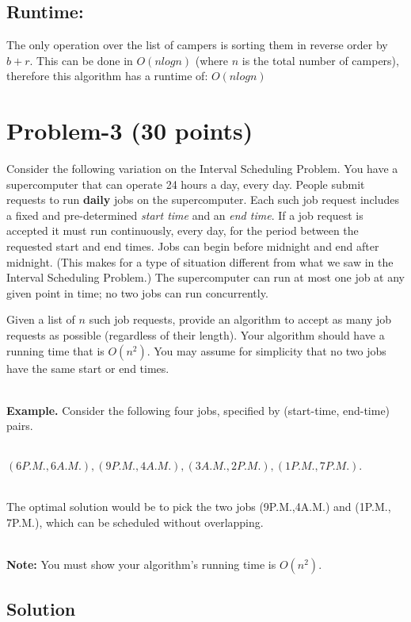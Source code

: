 \documentclass[11pt]{article}
\begin{document}
\subsection*{Runtime:}
The only operation over the list of campers is sorting them in reverse order by $b+r$. This can be done in $O(nlogn)$ (where $n$ is the total number of campers), therefore this algorithm has a runtime of: $O(nlogn)$

\newpage
\section*{Problem-3 (30 points)}
Consider the following variation on the Interval Scheduling Problem. You have a supercomputer that can operate 24 hours a day, every day. People submit requests to run {\bf daily} jobs on the supercomputer. Each such job request includes a fixed and pre-determined {\it start time} and an {\it end time}. If a job request is accepted it must run continuously, every day, for the period between the requested start and end times. Jobs can begin before midnight and end after midnight. (This makes for a type of situation different from what we saw in the Interval Scheduling Problem.) The supercomputer can run at most one job at any given point in time; no two jobs can run concurrently.

Given a list of $n$ such job requests, provide an algorithm to accept as many job requests as possible (regardless of their length). Your algorithm should have a running time that is $O(n^2)$. You may assume for simplicity that no two jobs have the same start or end times.

~\\
\noindent
{\bf Example.} Consider the following four jobs, specified by (start-time, end-time) pairs.

~\\
\indent
$(6P.M., 6A.M.), (9P.M., 4A.M.), (3A.M., 2P.M.), (1P.M., 7P.M.).$

~\\
\noindent
The optimal solution would be to pick the two jobs (9P.M.,4A.M.) and (1P.M., 7P.M.), which can be scheduled without overlapping.

~\\
\noindent
\textbf{Note:} You must show your algorithm's running time is $O(n^2)$. \\
 
 

\subsection*{Solution}
\end{document}
